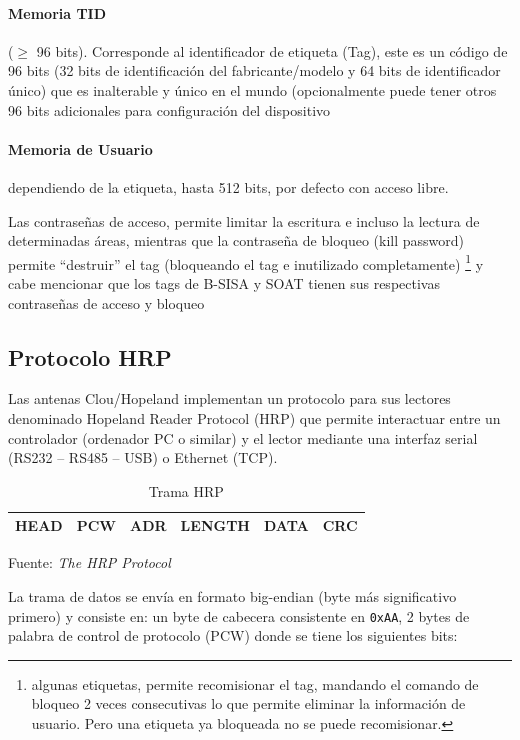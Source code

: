 \documentclass[fleqn,10pt]{SelfArx} %
\begin{document}
\paragraph{Memoria TID} ($\ge$ 96 bits). Corresponde al identificador de etiqueta (Tag), este es un código de 96 bits (32 bits de identificación del fabricante/modelo y 64 bits de identificador único) que es inalterable y único en el mundo (opcionalmente puede tener otros 96 bits adicionales para configuración del dispositivo
\paragraph{Memoria de Usuario} dependiendo de la etiqueta, hasta 512 bits, por defecto con acceso libre.

Las contraseñas de acceso, permite limitar la escritura e incluso la lectura de determinadas áreas, mientras que la contraseña de bloqueo (kill password) permite “destruir” el tag (bloqueando el tag e inutilizado completamente) \footnote{algunas etiquetas, permite recomisionar el tag, mandando el comando de bloqueo 2 veces consecutivas lo que permite eliminar la información de usuario. Pero una etiqueta ya bloqueada no se puede recomisionar.} y cabe mencionar que los tags de B-SISA y SOAT tienen sus respectivas contraseñas de acceso y bloqueo

\subsection*{Protocolo HRP}

Las antenas Clou/Hopeland implementan un protocolo para sus lectores denominado Hopeland Reader Protocol (HRP) que permite interactuar entre un controlador (ordenador PC o similar) y el lector mediante una interfaz serial (RS232 – RS485 – USB) o Ethernet (TCP).

\begin{table}[hbt]
\caption{Trama HRP}
\centering
\begin{tabular}{|l|l|l|l|l|l|}
\hline HEAD & PCW & ADR & LENGTH & DATA & CRC \\ \hline
\end{tabular}
\newline Fuente: \emph{The HRP Protocol} \cite{Hopeland:2016}
\label{tab:hrp_frame}
\end{table}

La trama de datos  se envía en formato big-endian (byte más significativo primero) y consiste en: un byte de cabecera consistente en \lstinline{0xAA}, 2 bytes de palabra de control de protocolo (PCW) donde se tiene los siguientes bits:
\end{document}
